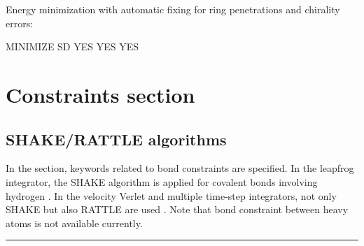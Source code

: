 \documentclass[a4paper,11pt,oneside,english]{sphinxmanual}
\begin{document}
Energy minimization with automatic fixing for ring penetrations and chirality errors:

\begin{sphinxVerbatim}[commandchars=\\\{\}]
\PYG{o}{[}MINIMIZE\PYG{o}{]}
               SD      
                   
              
              
            
            
       YES    
        YES    
   YES    
\end{sphinxVerbatim}


\chapter{Constraints section}
\label{\detokenize{08_Constraints:constraints-section}}\label{\detokenize{08_Constraints:constraints}}\label{\detokenize{08_Constraints::doc}}

\section{SHAKE/RATTLE algorithms}
\label{\detokenize{08_Constraints:shake-rattle-algorithms}}
In the \sphinxstylestrong{{[}CONSTRAINTS{]}} section, keywords related to bond constraints are specified.
In the leapfrog integrator, the SHAKE algorithm is applied for
covalent bonds involving hydrogen .
In the velocity Verlet and multiple time-step integrators,
not only SHAKE but also RATTLE are used .
Note that bond constraint between heavy atoms is not available currently.


\bigskip\hrule\bigskip
\end{document}
